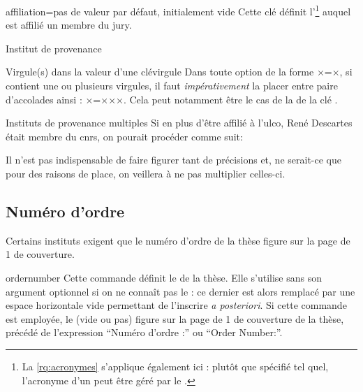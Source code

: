 \begin{docKey}{affiliation}{=}{pas de valeur par défaut,
    initialement vide}
  Cette clé définit l'\footnote{La \vref{rq:acronymes}
    s'applique également ici : plutôt que spécifié tel quel, l'acronyme d'un
     peut être géré par le .} auquel est
  affilié un membre du jury.
\end{docKey}
\begin{dbexample}{Institut de provenance}{}
\begin{bodycode}
\end{bodycode}
\end{dbexample}
%
\begin{dbwarning}{Virgule(s) dans la valeur d'une clé}{virgule}
  Dans toute option de la forme ×=×, si 
  contient une ou plusieurs virgules, il faut \emph{impérativement} la placer
  entre paire d'accolades ainsi : ×={××}×. Cela peut
  notamment être le cas de la  de la clé .
\end{dbwarning}
%
\begin{dbexample}{Instituts de provenance multiples}{}
  Si en plus d'être affilié à l'\gls{ulco}, René Descartes était membre du
  \gls{cnrs}, on pourait procéder comme suit:
\begin{bodycode}
\end{bodycode}
Il n'est pas indispensable de faire figurer tant de précisions et, ne serait-ce
que pour des raisons de place, on veillera à ne pas multiplier celles-ci.
\end{dbexample}

\subsection{Numéro d'ordre}
\label{sec:numero-dordre}

Certains instituts exigent que le numéro d'ordre de la thèse figure sur la page
de 1\iere{} de couverture.

\begin{docCommand}{ordernumber}{}
  Cette commande définit le  de la thèse. Elle s'utilise
  sans son argument optionnel si on ne connaît pas  le
   : ce dernier est alors remplacé par une espace
  horizontale vide permettant de l'inscrire \emph{a posteriori}. Si cette
  commande est employée, le  (vide ou pas) figure sur
   la page de 1\iere{} de couverture de la thèse,
  précédé de l'expression \enquote{Num\'ero d'ordre :} ou
  \foreignquote{english}{Order Number:}\selonlangue.
\end{docCommand}

